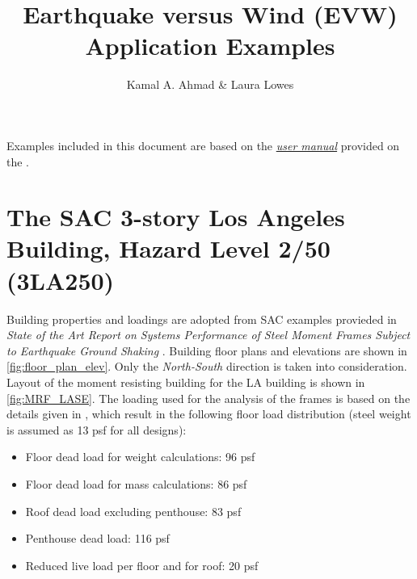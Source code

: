 \documentclass{simcenterdocumentation}
\begin{document}
\title{Earthquake versus Wind (EVW) Application Examples}

\author{Kamal A. Ahmad \& Laura Lowes}

\hypersetup{pageanchor=false}
\maketitle
\copyrightpage
\acknowledgments


\newpage

\graphicspath{{figures/}{}}

Examples included in this document are based on the \href{https://simcenter.designsafe-ci.org/media/filer_public/a0/68/a068ba45-6a47-46f4-83b1-fae585d8ccbe/evw_documentation.pdf}{\textit{user manual}} provided on the .

\renewcommand{\thesection}{Example \arabic{section}:}
\renewcommand{\thesubsection}{Example \arabic{subsection}:}

\section{The SAC 3-story Los Angeles Building, Hazard Level 2/50 (3LA250)}
Building properties and loadings are adopted from SAC examples provieded in \textit{State of the Art Report on Systems Performance of Steel Moment Frames Subject to Earthquake Ground Shaking} \cite{FEMA335c2000}. Building floor plans and elevations are shown in \cref{fig:floor_plan_elev}. Only the \textsl{North-South} direction is taken into consideration. Layout of the moment resisting building for the LA building is shown in \cref{fig:MRF_LASE}.
The loading used for the analysis of the frames is based on the details given in \cite{FEMA335c2000}, which result in the following floor load distribution (steel weight is assumed as 13 psf for all designs):

\begin{itemize}
\item[] Floor dead load for weight calculations: 96 psf
\item[] Floor dead load for mass calculations:  86 psf
\item[] Roof dead load excluding penthouse:  83 psf
\item[] Penthouse dead load:  116 psf
\item[] Reduced live load per floor and for roof: 20 psf
\end{itemize}
\end{document}
